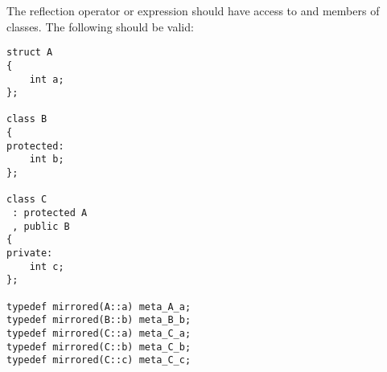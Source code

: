 The reflection operator or expression should have access to \verb@private@ and
\verb@protected@ members of classes. The following should be valid:

\begin{verbatim}
struct A
{
	int a;
};

class B
{
protected:
	int b;
};

class C
 : protected A
 , public B
{
private:
	int c;
};

typedef mirrored(A::a) meta_A_a;
typedef mirrored(B::b) meta_B_b;
typedef mirrored(C::a) meta_C_a;
typedef mirrored(C::b) meta_C_b;
typedef mirrored(C::c) meta_C_c;

\end{verbatim}
